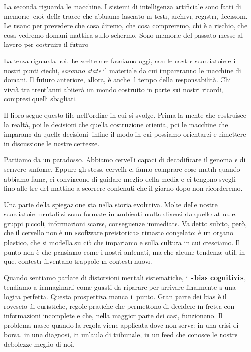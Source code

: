 La seconda riguarda le macchine. I sistemi di intelligenza artificiale sono fatti di memorie, cioè delle tracce che abbiamo lasciato in testi, archivi, registri, decisioni. Le usano per prevedere che cosa diremo, che cosa compreremo, chi è a rischio, che cosa vedremo domani mattina sullo schermo. Sono memorie del passato messe al lavoro per costruire il futuro.

La terza riguarda noi. Le scelte che facciamo oggi, con le nostre scorciatoie e i nostri punti ciechi, \textit{saranno state} il materiale da cui impareranno le macchine di domani. Il futuro anteriore, allora, è anche il tempo della responsabilità. Chi vivrà tra trent'anni abiterà un mondo costruito in parte sui nostri ricordi, compresi quelli sbagliati.


Il libro segue questo filo nell'ordine in cui si svolge. Prima la mente che costruisce la realtà, poi le decisioni che quella costruzione orienta, poi le macchine che imparano da quelle decisioni, infine il modo in cui possiamo orientarci e rimettere in discussione le nostre certezze.

Partiamo da un paradosso. Abbiamo cervelli capaci di decodificare il genoma e di scrivere sinfonie. Eppure gli stessi cervelli ci fanno comprare cose inutili quando abbiamo fame, ci convincono di guidare meglio della media e ci tengono svegli fino alle tre del mattino a scorrere contenuti che il giorno dopo non ricorderemo.

Una parte della spiegazione sta nella storia evolutiva. Molte delle nostre scorciatoie mentali si sono formate in ambienti molto diversi da quello attuale: gruppi piccoli, informazioni scarse, conseguenze immediate. Va detto subito, però, che il cervello non è un «software preistorico» rimasto congelato: è un organo plastico, che si modella su ciò che impariamo e sulla cultura in cui cresciamo. Il punto non è che pensiamo come i nostri antenati, ma che alcune tendenze utili in quei contesti diventano trappole in contesti nuovi.

Quando sentiamo parlare di distorsioni mentali sistematiche, i \textbf{«bias cognitivi»}, tendiamo a immaginarli come guasti da riparare per arrivare finalmente a una logica perfetta. Questa prospettiva manca il punto. Gran parte dei bias è il rovescio di euristiche, regole pratiche che permettono di decidere in fretta con informazioni incomplete e che, nella maggior parte dei casi, funzionano. Il problema nasce quando la regola viene applicata dove non serve: in una crisi di borsa, in una diagnosi, in un'aula di tribunale, in un feed che conosce le nostre debolezze meglio di noi.

